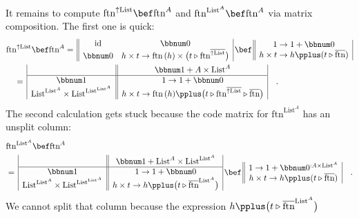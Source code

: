 It remains to compute $\text{ftn}^{\uparrow\text{List}}\bef\text{ftn}^{A}$
and $\text{ftn}^{\text{List}^{A}}\bef\text{ftn}^{A}$ via matrix composition.
The first one is quick:
\begin{align*}
 & \text{ftn}^{\uparrow\text{List}}\bef\text{ftn}^{A}=\,\begin{array}{||cc|}
\text{id} & \bbnum 0\\
\bbnum 0 & h\times t\rightarrow\text{ftn}\,(h)\times\big(t\triangleright\text{ftn}^{\overline{\uparrow\text{List}}}\big)
\end{array}\,\bef\,\begin{array}{||c|}
1\rightarrow1+\bbnum 0\\
h\times t\rightarrow h\pplus(t\triangleright\overline{\text{ftn}})
\end{array}\\
 & \quad=\,\begin{array}{|c||c|}
 & \bbnum 1+A\times\text{List}^{A}\\
\hline \bbnum 1 & 1\rightarrow1+\bbnum 0\\
\text{List}^{\text{List}^{A}}\times\text{List}^{\text{List}^{\text{List}^{A}}} & h\times t\rightarrow\text{ftn}\,(h)\pplus\big(t\triangleright\text{ftn}^{\overline{\uparrow\text{List}}}\triangleright\overline{\text{ftn}}\big)
\end{array}\quad.
\end{align*}
The second calculation gets stuck because the code matrix for $\text{ftn}^{\text{List}^{A}}$
has an unsplit column:
\begin{align*}
 & \text{ftn}^{\text{List}^{A}}\bef\text{ftn}^{A}\\
 & =\,\begin{array}{|c||c|}
 & \bbnum 1+\text{List}^{A}\times\text{List}^{\text{List}^{A}}\\
\hline \bbnum 1 & 1\rightarrow1+\bbnum 0\\
\text{List}^{\text{List}^{A}}\times\text{List}^{\text{List}^{\text{List}^{A}}} & h\times t\rightarrow h\pplus\big(t\triangleright\overline{\text{ftn}}^{\text{List}^{A}}\big)
\end{array}\,\bef\,\begin{array}{||c|}
1\rightarrow1+\bbnum 0^{:A\times\text{List}^{A}}\\
h\times t\rightarrow h\pplus(t\triangleright\overline{\text{ftn}})
\end{array}\quad.
\end{align*}
We cannot split that column because the expression $h\pplus\big(t\triangleright\overline{\text{ftn}}^{\text{List}^{A}}\big)$
